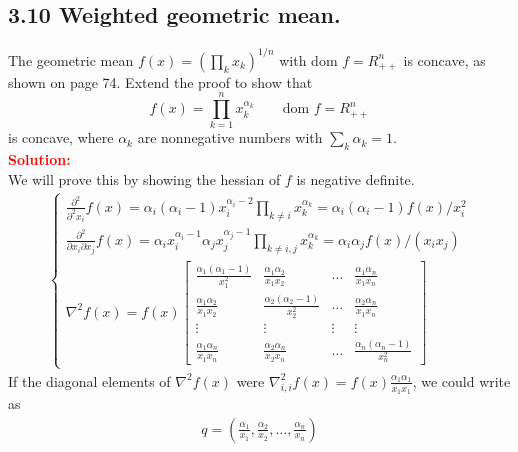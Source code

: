 \begin{latin}

\section{3.10 Weighted geometric mean.}
The geometric mean $ f(x) = (\prod_{k} x_{k})^{1/n} $ with dom $ f = R^{n}_{++} $ is concave, as shown on page 74. Extend the proof to show that
\begin{equation*}
	f(x) = \prod_{k=1}^{n} x_{k}^{\alpha_k} 
	\qquad
	\text{dom } f = R^{n}_{++}
\end{equation*}
is concave, where $ \alpha_k $ are nonnegative numbers with $ \sum_{k} \alpha_k = 1 $.
\\
\textcolor{red}{\textbf{Solution:}}
\\
We will prove this by showing the hessian of $ f $ is negative definite.
\begin{gather*}
	\begin{cases}
		\frac{\partial^{2}}{\partial^{2} x_{i}} f(x) = \alpha_i (\alpha_i-1) x_{i}^{\alpha_i-2} \prod_{k \neq i} x_{k}^{\alpha_k} =  \alpha_i (\alpha_i-1) f(x)/x_{i}^{2}
		\\
		\frac{\partial^{2}}{\partial x_{i} \partial x_{j}} f(x) = \alpha_i x_{i}^{\alpha_i-1} \alpha_j x_{j}^{\alpha_j-1} \prod_{k \neq i,j} x_{k}^{\alpha_k} = \alpha_i \alpha_j  f(x)/(x_{i} x_{j})
		\\
		\nabla^{2} f(x) = f(x) 
		\begin{bmatrix}
			\frac{\alpha_1 (\alpha_1-1)}{x_{1}^{2}} & \frac{\alpha_1 \alpha_2}{x_{1} x_{2}} & \dots & \frac{\alpha_1 \alpha_n}{x_{1} x_{n}}
			\\
			\frac{\alpha_1 \alpha_2}{x_{1} x_{2}} & \frac{\alpha_2 (\alpha_2-1)}{x_{2}^{2}} & \dots & \frac{\alpha_2 \alpha_n}{x_{1} x_{n}}
			\\
			\vdots & \vdots & \vdots & \vdots
			\\
			\frac{\alpha_1 \alpha_n}{x_{1} x_{n}} & \frac{\alpha_2 \alpha_n}{x_{2} x_{n}} & \dots & \frac{\alpha_n (\alpha_n-1)}{x_{n}^{2}}
		\end{bmatrix}
	\end{cases}
\end{gather*}
If the diagonal elements of $ \nabla^{2} f(x) $ were $ \nabla^{2}_{i,i} f(x) =  f(x) \frac{\alpha_1 \alpha_1}{x_{1} x_{1}} $, we could write as 
\begin{gather*}
	q = (\frac{\alpha_1}{x_1},\frac{\alpha_2}{x_2}, \dots , \frac{\alpha_n}{x_n})
	\\

\end{gather*}
\end{latin}
